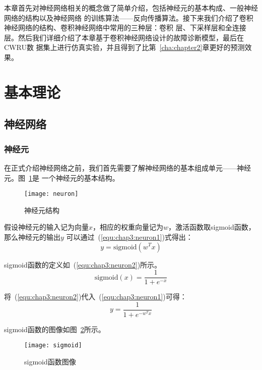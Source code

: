 本章首先对神经网络相关的概念做了简单介绍，包括神经元的基本构成、一般神经网络的结构以及神经网络
的训练算法——反向传播算法。接下来我们介绍了卷积神经网络的结构、卷积神经网络中常用的三种层：卷积
层、下采样层和全连接层。然后我们详细介绍了本章基于卷积神经网络设计的故障诊断模型，最后在CWRU数
据集上进行仿真实验，并且得到了比第~\ref{cha:chapter2}章更好的预测效果。

\section{基本理论}

\subsection{神经网络}
\label{subsection:nn}

\subsubsection{神经元}

在正式介绍神经网络之前，我们首先需要了解神经网络的基本组成单元——神经元。图~\ref{fig:neuron}是
一个神经元的基本结构。
\begin{figure}[ht]
  \centering%
  \texttt{[image: neuron]}
  \caption{神经元结构}
  \label{fig:neuron}
\end{figure}

假设神经元的输入记为向量$x$，相应的权重向量记为$w$，激活函数取sigmoid函数，那么神经元的输出$y$
可以通过~(\ref{equ:chap3:neuron1})式得出：
\begin{equation}
  \label{equ:chap3:neuron1}
  y = \text{sigmoid}(w^Tx)
\end{equation}

sigmoid函数的定义如~(\ref{equ:chap3:neuron2})所示。
\begin{equation}
  \label{equ:chap3:neuron2}
  \text{sigmoid}(x) = \frac{1}{1+e^{-x}}
\end{equation}

将~(\ref{equ:chap3:neuron2})代入~(\ref{equ:chap3:neuron1})可得：
\begin{equation}
  \label{equ:chap3:neuron3}
  y = \frac{1}{1+e^{-w^Tx}}
\end{equation}

sigmoid函数的图像如图~\ref{fig:sigmoid}所示。
\begin{figure}[ht]
  \centering
  \texttt{[image: sigmoid]}
  \caption{sigmoid函数图像}
  \label{fig:sigmoid}
\end{figure}

